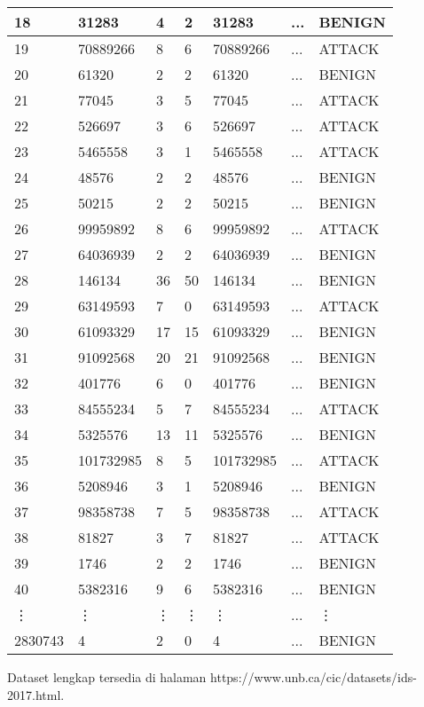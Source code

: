 \documentclass[a4paper,12pt]{report}
\begin{document}
\begin{table}[h!]
\begin{tabular}{|p{1.5cm}|p{1.5cm}|p{1.5cm}|p{1.5cm}|p{1.5cm}|p{1.5cm}|p{1.5cm}|}
			\hline
			18 & 31283 & 4 & 2 & 31283 & ... & BENIGN \\
			\hline
			19 & 70889266 & 8 & 6 & 70889266 & ... & ATTACK \\
			\hline
			20 & 61320 & 2 & 2 & 61320 & ... & BENIGN \\
			\hline
			21 & 77045 & 3 & 5 & 77045 & ... & ATTACK \\
			\hline
			22 & 526697 & 3 & 6 & 526697 & ... & ATTACK \\
			\hline
			23 & 5465558 & 3 & 1 & 5465558 & ... & ATTACK \\
			\hline
			24 & 48576 & 2 & 2 & 48576 & ... & BENIGN \\
			\hline
			25 & 50215 & 2 & 2 & 50215 & ... & BENIGN \\
			\hline
			26 & 99959892 & 8 & 6 & 99959892 & ... & ATTACK \\
			\hline
			27 & 64036939 & 2 & 2 & 64036939 & ... & BENIGN \\
			\hline
			28 & 146134 & 36 & 50 & 146134 & ... & BENIGN \\
			\hline
			29 & 63149593 & 7 & 0 & 63149593 & ... & ATTACK \\
			\hline
			30 & 61093329 & 17 & 15 & 61093329 & ... & BENIGN \\
			\hline
			31 & 91092568 & 20 & 21 & 91092568 & ... & BENIGN \\
			\hline
			32 & 401776 & 6 & 0 & 401776 & ... & BENIGN \\
			\hline
			33 & 84555234 & 5 & 7 & 84555234 & ... & ATTACK \\
			\hline
			34 & 5325576 & 13 & 11 & 5325576 & ... & BENIGN \\
			\hline
			35 & 101732985 & 8 & 5 & 101732985 & ... & ATTACK \\
			\hline
			36 & 5208946 & 3 & 1 & 5208946 & ... & BENIGN \\
			\hline
			37 & 98358738 & 7 & 5 & 98358738 & ... & ATTACK \\
			\hline
			38 & 81827 & 3 & 7 & 81827 & ... & ATTACK \\
			\hline
			39 & 1746 & 2 & 2 & 1746 & ... & BENIGN \\
			\hline
			40 & 5382316 & 9 & 6 & 5382316 & ... & BENIGN \\
			\hline
			\vdots & \vdots & \vdots & \vdots & \vdots & ... & \vdots \\
			\hline
			2830743 & 4 & 2 & 0 & 4 & ... & BENIGN \\
			\hline
		\end{tabular}
		
	\end{table}
	\noindent Dataset lengkap tersedia di halaman https://www.unb.ca/cic/datasets/ids-2017.html.
\end{document}
